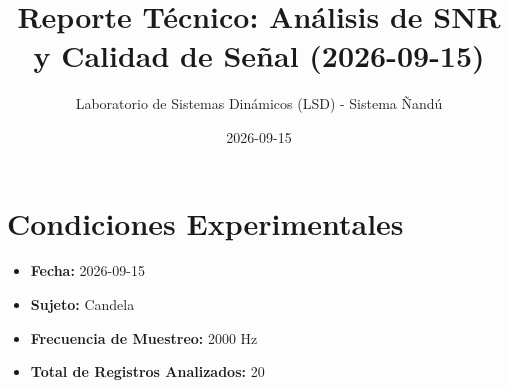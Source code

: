 \documentclass[11pt,a4paper]{article}
\title{\textbf{Reporte Técnico: Análisis de SNR y Calidad de Señal (2026-09-15)}}
\author{Laboratorio de Sistemas Dinámicos (LSD) - Sistema Ñandú}
\date{2026-09-15}
\begin{document}
\maketitle

\tableofcontents
\newpage
\section{Condiciones Experimentales}
\begin{itemize}
    \item \textbf{Fecha:} 2026-09-15
    \item \textbf{Sujeto:} Candela
    \item \textbf{Frecuencia de Muestreo:} 2000 Hz
    \item \textbf{Total de Registros Analizados:} 20
\end{itemize}
\end{document}
